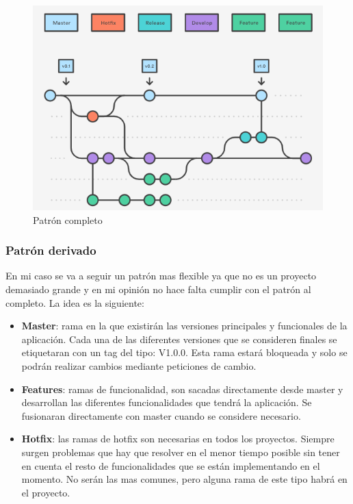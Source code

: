 \begin{figure}[H]
    \centering
    \includegraphics[scale=0.7]{imagenes/introduccion/gitflow.png}
    \caption{Patrón completo}
    \label{fig:gitflowCompleto}
\end{figure}

\subsubsection*{Patrón derivado}

En mi caso se va a seguir un patrón mas flexible ya que no es un proyecto demasiado grande y en mi opinión no hace falta cumplir con el patrón al completo. La idea es la siguiente: 
\begin{itemize}
    \item \textbf{Master}: rama en la que existirán las versiones principales y funcionales de la aplicación. Cada una de las diferentes versiones que se consideren finales se etiquetaran con un tag del tipo: V1.0.0. Esta rama estará bloqueada y solo se podrán realizar cambios mediante peticiones de cambio. 
    \item \textbf{Features}: ramas de funcionalidad, son sacadas directamente desde master y desarrollan las diferentes funcionalidades que tendrá la aplicación. Se fusionaran directamente con master cuando se considere necesario. 
    \item \textbf{Hotfix}: las ramas de hotfix son necesarias en todos los proyectos. Siempre surgen problemas que hay que resolver en el menor tiempo posible sin tener en cuenta el resto de funcionalidades que se están implementando en el momento. No serán las mas comunes, pero alguna rama de este tipo habrá en el proyecto. 
\end{itemize}
